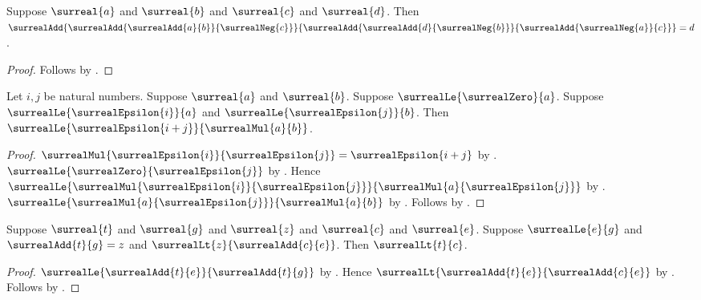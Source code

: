 \begin{lemma}\label{surreal_add_three_term_cancellation}
    Suppose $\surreal{a}$ and $\surreal{b}$ and
        $\surreal{c}$ and $\surreal{d}$.
    Then
        $\surrealAdd
            {\surrealAdd{\surrealAdd{a}{b}}{\surrealNeg{c}}}
            {\surrealAdd
                {\surrealAdd{d}{\surrealNeg{b}}}
                {\surrealAdd{\surrealNeg{a}}{c}}}
        =d$.
\end{lemma}
\begin{proof}
    Follows by
        .
\end{proof}

\begin{lemma}\label{surreal_epsilon_product_below_product}
    Let $i,j$ be natural numbers.
    Suppose $\surreal{a}$ and $\surreal{b}$.
    Suppose $\surrealLe{\surrealZero}{a}$.
    Suppose $\surrealLe{\surrealEpsilon{i}}{a}$ and
        $\surrealLe{\surrealEpsilon{j}}{b}$.
    Then
        $\surrealLe{\surrealEpsilon{i+j}}{\surrealMul{a}{b}}$.
\end{lemma}
\begin{proof}
    $\surrealMul{\surrealEpsilon{i}}{\surrealEpsilon{j}}
        =\surrealEpsilon{i+j}$
        by
        .
    $\surrealLe{\surrealZero}{\surrealEpsilon{j}}$
        by .
    Hence
        $\surrealLe
            {\surrealMul{\surrealEpsilon{i}}{\surrealEpsilon{j}}}
            {\surrealMul{a}{\surrealEpsilon{j}}}$
        by
        .
    $\surrealLe{\surrealMul{a}{\surrealEpsilon{j}}}
        {\surrealMul{a}{b}}$
        by
        .
    Follows by
        .
\end{proof}

\begin{lemma}\label{surreal_below_from_epsilon_gap}
    Suppose $\surreal{t}$ and $\surreal{g}$ and
        $\surreal{z}$ and $\surreal{c}$ and $\surreal{e}$.
    Suppose $\surrealLe{e}{g}$ and
        $\surrealAdd{t}{g}=z$ and
        $\surrealLt{z}{\surrealAdd{c}{e}}$.
    Then $\surrealLt{t}{c}$.
\end{lemma}
\begin{proof}
    $\surrealLe{\surrealAdd{t}{e}}{\surrealAdd{t}{g}}$
        by .
    Hence $\surrealLt{\surrealAdd{t}{e}}{\surrealAdd{c}{e}}$
        by
        .
    Follows by .
\end{proof}

